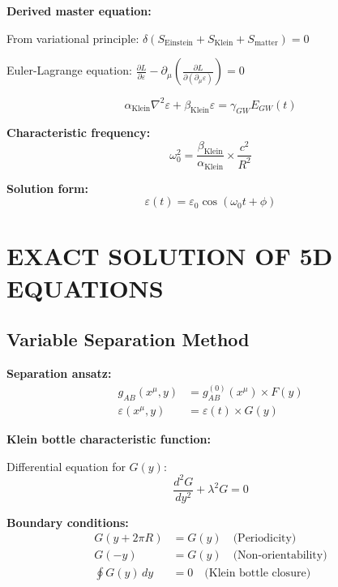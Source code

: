 \documentclass[12pt,a4paper]{article}
\begin{document}
\textbf{Derived master equation:}

From variational principle: $\delta(S_{\text{Einstein}} + S_{\text{Klein}} + S_{\text{matter}}) = 0$

Euler-Lagrange equation: $\frac{\partial L}{\partial\varepsilon} - \partial_\mu\left(\frac{\partial L}{\partial(\partial_\mu \varepsilon)}\right) = 0$

\begin{equation}
\boxed{
\alpha_{\text{Klein}} \nabla^2\varepsilon + \beta_{\text{Klein}} \varepsilon = \gamma_{GW} E_{GW}(t)
}
\end{equation}

\textbf{Characteristic frequency:}
\begin{equation}
\omega_0^2 = \frac{\beta_{\text{Klein}}}{\alpha_{\text{Klein}}} \times \frac{c^2}{R^2}
\end{equation}

\textbf{Solution form:}
\begin{equation}
\varepsilon(t) = \varepsilon_0 \cos(\omega_0 t + \phi)
\end{equation}

\section{EXACT SOLUTION OF 5D EQUATIONS}

\subsection{Variable Separation Method}

\textbf{Separation ansatz:}
\begin{align}
g_{AB}(x^\mu, y) &= g_{AB}^{(0)}(x^\mu) \times F(y)\\
\varepsilon(x^\mu, y) &= \varepsilon(t) \times G(y)
\end{align}

\textbf{Klein bottle characteristic function:}

Differential equation for $G(y)$:
\begin{equation}
\frac{d^2G}{dy^2} + \lambda^2G = 0
\end{equation}

\textbf{Boundary conditions:}
\begin{align}
G(y + 2\pi R) &= G(y) \quad \text{(Periodicity)}\\
G(-y) &= G(y) \quad \text{(Non-orientability)}\\
\oint G(y) \, dy &= 0 \quad \text{(Klein bottle closure)}
\end{align}
\end{document}

